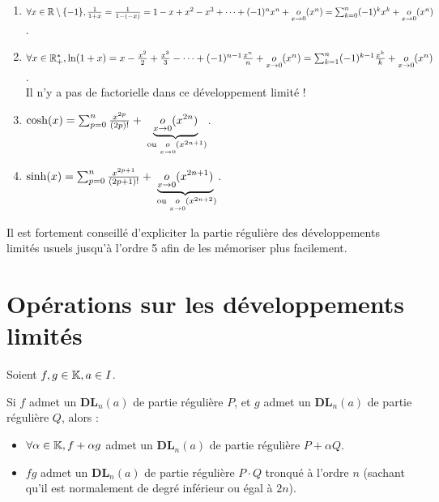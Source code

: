 \documentclass[12pt, a4paper]{report}
\begin{document}
\begin{example}
\begin{enumerate}
        \item $\forall x \in \mathbb{R}\setminus\{-1\}, \frac{1}{1+x} = \frac{1}{1-(-x)} = 1 - x + x^2 - x^3 + \dots + (-1)^n x^n + \underset{x\to 0}{o}(x^n)\\=\sum_{k=0}^{n}(-1)^k x^k + \underset{x\to 0}{o}(x^n)$.
        \item $\forall x \in \mathbb{R}_+^*, \ln(1+x) = x - \frac{x^2}{2} + \frac{x^3}{3} - \dots + (-1)^{n-1} \frac{x^n}{n} + \underset{x\to 0}{o}(x^n)\\=\sum_{k=1}^{n} (-1)^{k-1} \frac{x^k}{k} + \underset{x\to 0}{o}(x^n)$.\\Il n'y a pas de factorielle dans ce développement limité !
        \item $\cosh(x) = \sum_{p=0}^{n} \frac{x^{2p}}{(2p)!} + \underbrace{\underset{x\to 0}{o}(x^{2n})}_{\text{ ou } \underset{x\to 0}{o}(x^{2n+1})}$.
        \item $\sinh(x) = \sum_{p=0}^{n} \frac{x^{2p+1}}{(2p+1)!} + \underbrace{\underset{x\to 0}{o}(x^{2n+1})}_{\text{ ou } \underset{x\to 0}{o}(x^{2n+2})}$.
    \end{enumerate}
\end{example}

\begin{methodbox}
    Il est fortement conseillé d'expliciter la partie régulière des développements limités usuels jusqu'à l'ordre 5 afin de les mémoriser plus facilement.
\end{methodbox}

\section{Opérations sur les développements limités}

\begin{property}
    Soient $f,g \in \mathbb{K}, a \in I$.

    Si $f$ admet un $\mathbf{DL}_n(a)$ de partie régulière $P$, et $g$ admet un $\mathbf{DL}_n(a)$ de partie régulière $Q$, alors :
    \begin{itemize}
        \item $\forall \alpha \in \mathbb{K}, f + \alpha g$ admet un $\mathbf{DL}_n(a)$ de partie régulière $P + \alpha Q$.
        \item $fg$ admet un $\mathbf{DL}_n(a)$ de partie régulière $P\cdot Q$ tronqué à l'ordre $n$ (sachant qu'il est normalement de degré inférieur ou égal à $2n$).
    \end{itemize}
\end{property}
\end{document}

